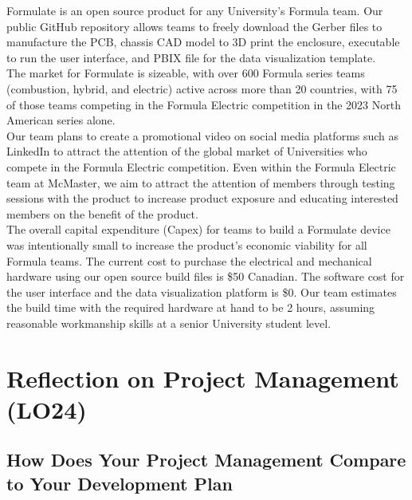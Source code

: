 \documentclass[12pt]{article}
\begin{document}
Formulate is an open source product for any University's Formula team. Our public GitHub repository allows teams to freely download the Gerber files to manufacture the PCB, chassis CAD model to 3D print the enclosure, executable to run the user interface, and PBIX file for the data visualization template. \\

The market for Formulate is sizeable, with over 600 Formula series teams (combustion, hybrid, and electric) active across more than 20 countries, with 75 of those teams competing in the Formula Electric competition in the 2023 North American series alone. \\

Our team plans to create a promotional video on social media platforms such as LinkedIn to attract the attention of the global market of Universities who compete in the Formula Electric competition. Even within the Formula Electric team at McMaster, we aim to attract the attention of members through testing sessions with the product to increase product exposure and educating interested members on the benefit of the product. \\

The overall capital expenditure (Capex) for teams to build a Formulate device was intentionally small to increase the product's economic viability for all Formula teams. The current cost to purchase the electrical and mechanical hardware using our open source build files is \$50 Canadian. The software cost for the user interface and the data visualization platform is \$0. Our team estimates the build time with the required hardware at hand to be 2 hours, assuming reasonable workmanship skills at a senior University student level. \\



\section{Reflection on Project Management (LO24)}


\subsection{How Does Your Project Management Compare to Your Development Plan}

\end{document}
